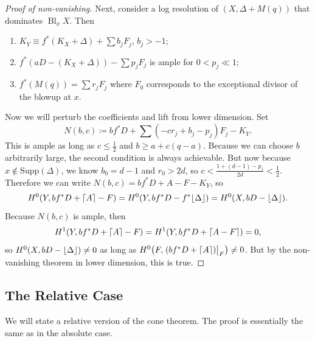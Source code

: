 \documentclass[leqno, openany]{memoir}
\DeclarePairedDelimiter{\floor}{\lfloor}{\rfloor}
\DeclarePairedDelimiter{\ceil}{\lceil}{\rceil}
\theoremstyle{definition}
\theoremstyle{remark}
\theoremstyle{plain}
\theoremstyle{definition}
\theoremstyle{remark}
\newcommand{\mr}[1]{\mathrm{#1}}
\DeclareMathOperator{\Bl}{Bl}
\begin{document}
\begin{proof}[Proof of non-vanishing]
    Next, consider a log resolution of $(X, \Delta + M(q))$ that dominates $\Bl_x X$. Then
    \begin{enumerate}
        \item $K_Y \equiv f^*(K_X + \Delta) + \sum b_j F_j$, $b_j > -1$;
        \item $f^*(aD - (K_X + \Delta)) - \sum p_j F_j$ is ample for $0 < p_j \ll 1$;
        \item $f^*(M(q)) = \sum r_j F_j$ where $F_0$ corresponds to the exceptional divisor of the blowup at $x$.
    \end{enumerate}

    Now we will perturb the coefficients and lift from lower dimension. Set
    \[ N(b,c) \coloneqq b f^* D + \sum (-c r_j + b_j - p_j) F_j - K_Y. \]
    This is ample as long as $c \leq \frac{1}{2}$ and $b \geq a + c(q-a)$. Because we can choose $b$ arbitrarily large, the second condition is always achievable. But now because $x \notin \mr{Supp}(\Delta)$, we know $b_0 = d-1$ and $r_0 > 2d$, so $c < \frac{1+(d-1)-p_1}{2d} < \frac{1}{2}$. Therefore we can write $N(b,c) = bf^* D + A - F - K_Y$, so 
    \[ H^0(Y, bf^*D + \ceil{A} - F) = H^0(Y, bf^*D - f^* \floor{\Delta}) = H^0(X, bD - \floor{\Delta}). \]
    Because $N(b,c)$ is ample, then
    \[ H^1(Y, bf^*D + \ceil{A} - F) = H^1(Y, bf^*D + \ceil{A-F}) = 0,\] 
    so $H^0(X, bD - \floor{\Delta}) \neq 0$ as long as $H^0\qty(F, \eval{(bf^*D + \ceil{A})}_F) \neq 0$. But by the non-vanishing theorem in lower dimension, this is true.
\end{proof}

\subsection{The Relative Case}%
\label{sub:the_relative_case}

We will state a relative version of the cone theorem. The proof is essentially the same as in the absolute case.
\end{document}
